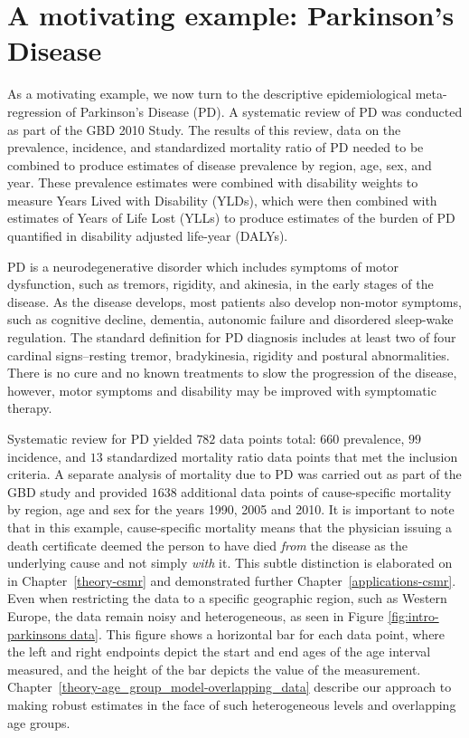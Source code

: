 \section{A motivating example: Parkinson's Disease}
\label{intro-complete_ex}

As a motivating example, we now turn to the descriptive
epidemiological meta-regression of Parkinson's Disease (PD). A
systematic review of PD was conducted as part of the GBD 2010
Study.\cite{TK_GBD_2010_or_parkinsons_paper} The results of this review,
data on the prevalence, incidence, and standardized mortality ratio of PD
needed to be combined to produce estimates of disease prevalence by
region, age, sex, and year.  These prevalence estimates were combined
with disability weights to measure Years Lived with Disability (YLDs),
which were then combined with estimates of Years of Life Lost (YLLs)
to produce estimates of the burden of PD quantified in disability
adjusted life-year (DALYs).

PD is a neurodegenerative disorder which includes symptoms of motor
dysfunction, such as tremors, rigidity, and akinesia, in the early
stages of the disease.  As the disease develops, most patients also
develop non-motor symptoms, such as cognitive decline, dementia,
autonomic failure and disordered sleep-wake regulation.  The standard
definition for PD diagnosis includes at least two of four cardinal
signs--resting tremor, bradykinesia, rigidity and postural abnormalities.
There is no cure and no known treatments to slow the progression of the disease,
however, motor symptoms and disability may be improved with
symptomatic therapy.\cite{poewe_natural_2006, pollock_prevalence_1966, larsen_clinical_1994}

Systematic review for PD yielded $782$ data points total: $660$
prevalence, $99$ incidence, and $13$ standardized mortality ratio data
points that met the inclusion criteria.  A separate analysis of
mortality due to PD was carried out as part of the GBD study and
provided $1638$ additional data points of cause-specific mortality by
region, age and sex for the years 1990, 2005 and 2010.  It is
important to note that in this example, cause-specific mortality means
that the physician issuing a death certificate deemed the person to
have died \emph{from} the disease as the underlying cause and not
simply \emph{with} it.  This subtle distinction is elaborated on in
Chapter~\ref{theory-csmr} and demonstrated further
Chapter~\ref{applications-csmr}.  Even when restricting the data to a
specific geographic region, such as Western Europe, the data remain
noisy and heterogeneous, as seen in Figure \ref{fig:intro-parkinsons
  data}. This figure shows a horizontal bar for each data point, where
the left and right endpoints depict the start and end ages of the age
interval measured, and the height of the bar depicts the value of the
measurement. Chapter~\ref{theory-age_group_model-overlapping_data}
describe our approach to making
robust estimates in the face of such heterogeneous levels and
overlapping age groups.

